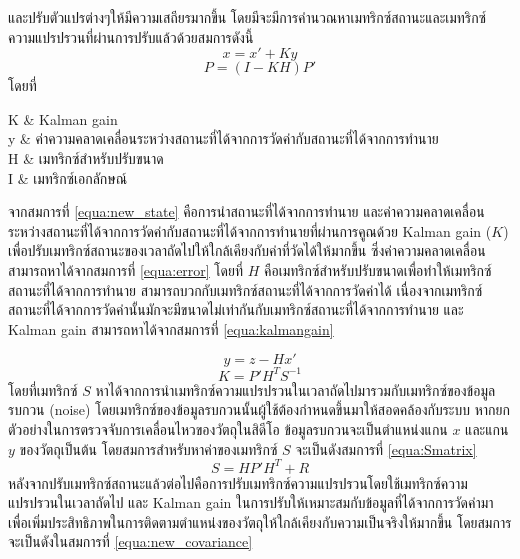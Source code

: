 \begin{enumerate}
	และปรับตัวแปรต่างๆให้มีความเสถียรมากขึ้น โดยมีจะมีการคำนวณหาเมทริกซ์สถานะและเมทริกซ์ความแปรปรวนที่ผ่านการปรับแล้วด้วยสมการดังนี้
	\begin{equation}
		x = x' + Ky
		\label{equa:new_state}
	\end{equation}
	\begin{equation}
		P = (I-KH)P'
		\label{equa:new_covariance}
	\end{equation}
	โดยที่
	\begin{conditions}
		K		&	Kalman gain\\
		y		&	ค่าความคลาดเคลื่อนระหว่างสถานะที่ได้จากการวัดค่ากับสถานะที่ได้จากการทำนาย\\
		H		&	เมทริกซ์สำหรับปรับขนาด\\
		I		&	เมทริกซ์เอกลักษณ์
	\end{conditions}
	จากสมการที่ \ref{equa:new_state} คือการนำสถานะที่ได้จากการทำนาย และค่าความคลาดเคลื่อนระหว่างสถานะที่ได้จากการวัดค่ากับสถานะที่ได้จากการทำนายที่ผ่านการคูณด้วย Kalman gain ($K$) 
	เพื่อปรับเมทริกซ์สถานะของเวลาถัดไปให้ใกล้เคียงกับค่าที่วัดได้ให้มากขึ้น ซึ่งค่าความคลาดเคลื่อนสามารถหาได้จากสมการที่ \ref{equa:error} โดยที่ $H$ คือเมทริกซ์สำหรับปรับขนาดเพื่อทำให้เมทริกซ์สถานะที่ได้จากการทำนาย
	สามารถบวกกับเมทริกซ์สถานะที่ได้จากการวัดค่าได้ เนื่องจากเมทริกซ์สถานะที่ได้จากการวัดค่านั้นมักจะมีขนาดไม่เท่ากันกับเมทริกซ์สถานะที่ได้จากการทำนาย และ Kalman gain สามารถหาได้จากสมการที่ \ref{equa:kalmangain}

	\begin{equation}
		y = z - Hx'
		\label{equa:error}
	\end{equation}
	\begin{equation}
		K = P'H^TS^{-1}
		\label{equa:kalmangain}
	\end{equation}
	โดยที่เมทริกซ์ $S$ หาได้จากการนำเมทริกซ์ความแปรปรวนในเวลาถัดไปมารวมกับเมทริกซ์ของข้อมูลรบกวน (noise) โดยเมทริกซ์ของข้อมูลรบกวนนั้นผู้ใช้ต้องกำหนดขึ้นมาให้สอดคล้องกับระบบ 
	หากยกตัวอย่างในการตรวจจับการเคลื่อนไหวของวัตถุในสิดีโอ ข้อมูลรบกวนจะเป็นตำแหน่งแกน $x$ และแกน $y$ ของวัตถุเป็นต้น โดยสมการสำหรับหาค่าของเมทริกซ์ $S$ จะเป็นดังสมการที่ \ref{equa:Smatrix}
	\begin{equation}
		S = HP'H^T + R
		\label{equa:Smatrix}
	\end{equation}
	หลังจากปรับเมทริกซ์สถานะแล้วต่อไปคือการปรับเมทริกซ์ความแปรปรวนโดยใช้เมทริกซ์ความแปรปรวนในเวลาถัดไป และ Kalman gain ในการปรับให้เหมาะสมกับข้อมูลที่ได้จากการวัดค่ามา 
	เพื่อเพิ่มประสิทธิภาพในการติดตามตำแหน่งของวัตถุให้ใกล้เคียงกับความเป็นจริงให้มากขึ้น โดยสมการจะเป็นดังในสมการที่ \ref{equa:new_covariance}
\end{enumerate}
